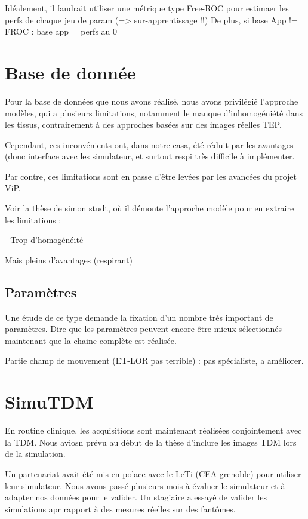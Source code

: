 Idéalement, il faudrait utiliser une métrique type Free-ROC pour estimaer les perfs de chaque jeu de param (=> sur-apprentissage !!)
De plus, si base App != FROC : base app = perfs au 0

\section{Base de donnée}

Pour la base de données que nous avons réalisé, nous avons privilégié l'approche modèles, qui a plusieurs limitations, notamment le manque d'inhomogéniété dans les tissus, contrairement à des approches basées sur des images réelles TEP. 

Cependant, ces inconvénients ont, dans notre casa, été réduit par les avantages (donc interface avec les simulateur, et surtout respi très difficile à implémenter.

Par contre, ces limitations sont en passe d'être levées par les avancées du projet ViP.


Voir la thèse de simon studt, où il démonte l'approche modèle pour en extraire les limitations :

- Trop d'homogénéité

Mais pleins d'avantages (respirant)

\subsection{Paramètres}

Une étude de ce type demande  la fixation d'un nombre très important de paramètres. 
Dire que les paramètres peuvent encore être mieux sélectionnés maintenant que la chaine complète est réalisée.

Partie champ de mouvement (ET-LOR pas terrible) : pas spécialiste, a améliorer.


\section{SimuTDM}

En routine clinique, les acquisitions sont maintenant réalisées conjointement avec la TDM. Nous aviosn prévu au début de la thèse d'inclure les images TDM lors de la simulation. 

Un partenariat avait été mis en polace avec le LeTi (CEA grenoble) pour utiliser leur simulateur. Nous avons passé plusieurs mois à évaluer le simulateur et à adapter nos données pour le valider. Un stagiaire a essayé de valider les simulations apr rapport à des mesures réelles sur des fantômes. 


